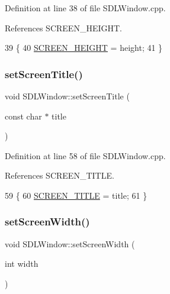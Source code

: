 Definition at line 38 of file S\+D\+L\+Window.\+cpp.



References S\+C\+R\+E\+E\+N\+\_\+\+H\+E\+I\+G\+HT.


\begin{DoxyCode}
39 \{
40     \hyperlink{class_s_d_l_window_aed36cc4e541ecf78cda7e92f99a84d71}{SCREEN\_HEIGHT} = height;
41 \}
\end{DoxyCode}
\mbox{\label{class_s_d_l_window_a1be36c2e5e329d203e929d59f2d5c308}} 
\subsubsection{\texorpdfstring{set\+Screen\+Title()}{setScreenTitle()}}
{\footnotesize\ttfamily void S\+D\+L\+Window\+::set\+Screen\+Title (\begin{DoxyParamCaption}\item[{const char $\ast$}]{title }\end{DoxyParamCaption})}



Definition at line 58 of file S\+D\+L\+Window.\+cpp.



References S\+C\+R\+E\+E\+N\+\_\+\+T\+I\+T\+LE.


\begin{DoxyCode}
59 \{
60     \hyperlink{class_s_d_l_window_afeb1a7d48dde026d437babea6667ebee}{SCREEN\_TITLE} = title;
61 \}
\end{DoxyCode}
\mbox{\label{class_s_d_l_window_a36930c7e4f3dee77c19283a3ede6287d}} 
\subsubsection{\texorpdfstring{set\+Screen\+Width()}{setScreenWidth()}}
{\footnotesize\ttfamily void S\+D\+L\+Window\+::set\+Screen\+Width (\begin{DoxyParamCaption}\item[{int}]{width }\end{DoxyParamCaption})}




